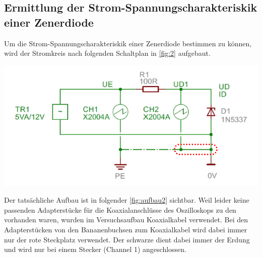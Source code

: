 \documentclass[11pt,ngerman]{scrartcl}
\begin{document}
\subsection{Ermittlung der Strom-Spannungscharakteriskik einer Zenerdiode}

Um die Strom-Spannungscharakteriskik einer Zenerdiode bestimmen zu können, wird der Stromkreis nach folgenden Schaltplan in \autoref{fig:2} aufgebaut.

\begin{center}
	\begin{minipage}[t]{0.8\textwidth}
		\includegraphics[width=\textwidth]{skizze_2}
		\label{fig:2}
	\end{minipage}
\end{center}

\noindent Der tatsächliche Aufbau ist in folgender \autoref{fig:aufbau2} sichtbar. Weil leider keine passenden Adapterstücke für die Koaxialanschlüsse des Oszilloskops zu den vorhanden waren, wurden im Versuchsaufbau Koaxialkabel verwendet. Bei den Adapterstücken von den Bananenbuchsen zum Koaxialkabel
wird dabei immer nur der rote Steckplatz verwendet. Der schwarze dient dabei immer der Erdung und wird nur bei einem Stecker (Channel 1) angeschlossen.
\end{document}
